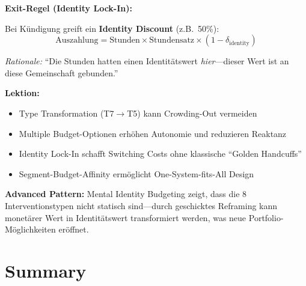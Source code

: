 \textbf{Exit-Regel (Identity Lock-In):}

Bei Kündigung greift ein \textbf{Identity Discount} (z.B.\ 50\%):
\begin{equation}
\text{Auszahlung} = \text{Stunden} \times \text{Stundensatz} \times (1 - \delta_{\text{identity}})
\end{equation}

\textit{Rationale:} ``Die Stunden hatten einen Identitätswert \textit{hier}---dieser Wert ist an diese Gemeinschaft gebunden.''

\textbf{Lektion:}
\begin{itemize}[nosep]
\item Type Transformation (T7$\rightarrow$T5) kann Crowding-Out vermeiden
\item Multiple Budget-Optionen erhöhen Autonomie und reduzieren Reaktanz
\item Identity Lock-In schafft Switching Costs ohne klassische ``Golden Handcuffs''
\item Segment-Budget-Affinity ermöglicht One-System-fits-All Design
\end{itemize}

\begin{tcolorbox}[colback=blue!5!white, colframe=blue!75!black]
\textbf{Advanced Pattern:} Mental Identity Budgeting zeigt, dass die 8 Interventionstypen nicht statisch sind---durch geschicktes Reframing kann monetärer Wert in Identitätswert transformiert werden, was neue Portfolio-Möglichkeiten eröffnet.
\end{tcolorbox}



\section{Summary}
\label{sec:17-summary}

